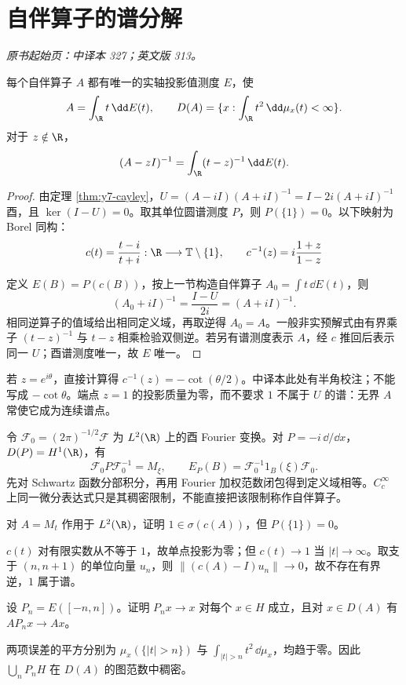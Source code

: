 \section{自伴算子的谱分解}\label{sec:yosida-11-06}
\noindent\textit{原书起始页：中译本 327；英文版 313。}

\begin{theorem}[无界自伴谱定理]\label{thm:y11-self-adjoint}
每个自伴算子 $A$ 都有唯一的实轴投影值测度 $E$，使
\[
 A=\int_\R t\,\dd E(t),\qquad
 D(A)=\{x:\int_\R t^2\,\dd\mu_x(t)<\infty\}.
\]
对于 $z\notin\R$，
\[
 (A-zI)^{-1}=\int_\R(t-z)^{-1}\,\dd E(t).
\]
\end{theorem}
\begin{proof}
由定理 \ref{thm:y7-cayley}，$U=(A-iI)(A+iI)^{-1}=I-2i(A+iI)^{-1}$ 酉，且 $\ker(I-U)=0$。取其单位圆谱测度 $P$，则 $P(\{1\})=0$。以下映射为 Borel 同构：
\[
 c(t)=\frac{t-i}{t+i}:\R\longrightarrow\mathbb T\setminus\{1\},\qquad
 c^{-1}(z)=i\frac{1+z}{1-z}
\]
\par{}
定义 $E(B)=P(c(B))$，按上一节构造自伴算子 $A_0=\int t\,\dd E(t)$，则
\[
 (A_0+iI)^{-1}=\frac{I-U}{2i}=(A+iI)^{-1}.
\]
相同逆算子的值域给出相同定义域，再取逆得 $A_0=A$。一般非实预解式由有界乘子 $(t-z)^{-1}$ 与 $t-z$ 相乘检验双侧逆。若另有谱测度表示 $A$，经 $c$ 推回后表示同一 $U$；酉谱测度唯一，故 $E$ 唯一。
\end{proof}

若 $z=e^{i\theta}$，直接计算得 $c^{-1}(z)=-\cot(\theta/2)$。中译本此处有半角校注；不能写成 $-\cot\theta$。端点 $z=1$ 的投影质量为零，而不要求 $1$ 不属于 $U$ 的谱：无界 $A$ 常使它成为连续谱点。

\begin{example}[动量算子的定义域]
令 $\mathcal F_0=(2\pi)^{-1/2}\mathcal F$ 为 $L^2(\R)$ 上的酉 Fourier 变换。对 $P=-i\,\dd/\dd x$，$D(P)=H^1(\R)$，有
\[
 \mathcal F_0P\mathcal F_0^{-1}=M_\xi,\qquad
 E_P(B)=\mathcal F_0^{-1}1_B(\xi)\mathcal F_0.
\]
先对 Schwartz 函数分部积分，再用 Fourier 加权范数闭包得到定义域相等。$C_c^\infty$ 上同一微分表达式只是其稠密限制，不能直接把该限制称作自伴算子。
\end{example}

\begin{exercise}\label{ex:y11-cayley-endpoint}
对 $A=M_t$ 作用于 $L^2(\R)$，证明 $1\in\sigma(c(A))$，但 $P(\{1\})=0$。
\end{exercise}
\begin{solution}
$c(t)$ 对有限实数从不等于 $1$，故单点投影为零；但 $c(t)\to1$ 当 $|t|\to\infty$。取支于 $(n,n+1)$ 的单位向量 $u_n$，则 $\|(c(A)-I)u_n\|\to0$，故不存在有界逆，$1$ 属于谱。
\end{solution}

\begin{exercise}[谱截断是图范数逼近]\label{ex:y11-spectral-core}
设 $P_n=E([-n,n])$。证明 $P_nx\to x$ 对每个 $x\in H$ 成立，且对 $x\in D(A)$ 有 $AP_nx\to Ax$。
\end{exercise}
\begin{solution}
两项误差的平方分别为 $\mu_x(\{|t|>n\})$ 与 $\int_{|t|>n}t^2\,\dd\mu_x$，均趋于零。因此 $\bigcup_nP_nH$ 在 $D(A)$ 的图范数中稠密。
\end{solution}
